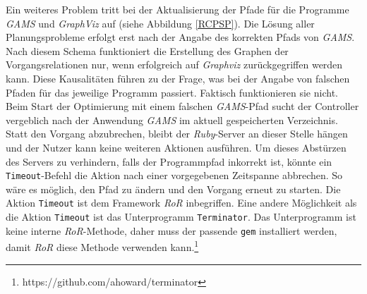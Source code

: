\documentclass[a4paper,12pt,parskip,bibtotoc,liststotoc]{article}
\begin{document}
Ein weiteres Problem tritt bei der Aktualisierung der Pfade für die Programme \textit{GAMS} und \textit{GraphViz} auf (siehe Abbildung \ref{RCPSP}). Die Lösung aller Planungsprobleme erfolgt erst nach der Angabe des korrekten Pfads von \textit{GAMS}. Nach diesem Schema funktioniert die Erstellung des Graphen der Vorgangsrelationen nur, wenn erfolgreich auf \textit{Graphviz} zurückgegriffen werden kann. Diese Kausalitäten führen zu der Frage, was bei der Angabe von falschen Pfaden für das jeweilige Programm passiert. Faktisch funktionieren sie nicht. Beim Start der Optimierung mit einem falschen \textit{GAMS}-Pfad sucht der Controller vergeblich nach der Anwendung \textit{GAMS} im aktuell gespeicherten Verzeichnis. Statt den Vorgang abzubrechen, bleibt der \textit{Ruby}-Server an dieser Stelle hängen und der Nutzer kann keine weiteren Aktionen ausführen. Um dieses \glqq Abstürzen\grqq\; des Servers zu verhindern, falls der Programmpfad inkorrekt ist, könnte ein \texttt{Timeout}-Befehl die Aktion nach einer vorgegebenen Zeitspanne abbrechen. So wäre es möglich, den Pfad zu ändern und den Vorgang erneut zu starten. Die Aktion \texttt{Timeout} ist dem Framework \textit{RoR} inbegriffen. Eine andere Möglichkeit als die Aktion \texttt{Timeout} ist das Unterprogramm \texttt{Terminator}. Das Unterprogramm ist keine interne \textit{RoR}-Methode, daher muss der passende \texttt{gem} installiert werden, damit \textit{RoR} diese Methode verwenden kann.\footnote{https://github.com/ahoward/terminator}\\
\end{document}
